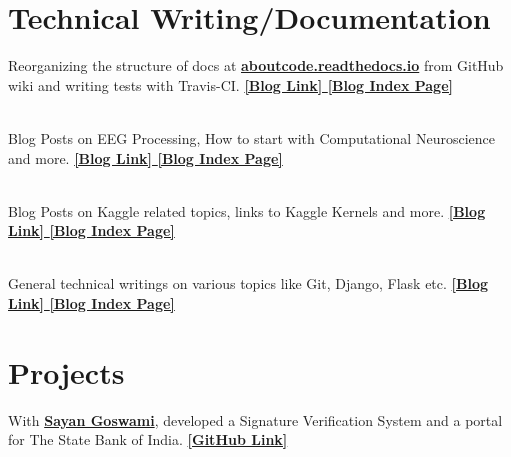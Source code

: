 \documentclass[]{deedy-resume-openfont}
\begin{document}
\begin{minipage}[t]{0.66\textwidth} 


\section{Technical Writing/Documentation}
Reorganizing the structure of docs at \textbf{\href{https://aboutcode.readthedocs.io/en/latest/}{aboutcode.readthedocs.io}} from GitHub wiki and writing tests with Travis-CI. 
\textbf{\href{https://ayansinha.dev/blog/archive.html?tag=OSS}{ [Blog Link] }}
\textbf{\href{https://ayansinha.dev/2019/06/15/index-oss.html}{ [Blog Index Page] }} 
\sectionsep

\\
Blog Posts on EEG Processing, How to start with Computational Neuroscience and more.
\textbf{\href{https://ayansinha.dev/blog/archive.html?tag=Neuroscience}{ [Blog Link] }} 
\textbf{\href{https://ayansinha.dev/2019/06/15/index-neuro.html}{ [Blog Index Page] }} 
\sectionsep

\\
Blog Posts on Kaggle related topics, links to Kaggle Kernels and more.
\textbf{\href{https://ayansinha.dev/blog/archive.html?tag=Kaggle}{ [Blog Link] }} 
\textbf{\href{https://ayansinha.dev/2019/06/15/index-kaggle.html}{ [Blog Index Page] }} 
\sectionsep

\\
General technical writings on various topics like Git, Django, Flask etc.
\textbf{\href{https://ayansinha.dev/blog/archive.html?tag=Tech_Writings}{ [Blog Link] }} 
\textbf{\href{https://ayansinha.dev/2019/06/15/index-tech-writing.html}{ [Blog Index Page] }}
\sectionsep


\section{Projects}
With \textbf{\href{https://github.com/Sayan98}{Sayan Goswami}}, developed a Signature Verification System and a portal for The State Bank of India. \textbf{\href{https://github.com/AyanSinhaMahapatra/AutoSIGN}{ [GitHub Link] }}
\sectionsep


\end{minipage}
\end{document}
